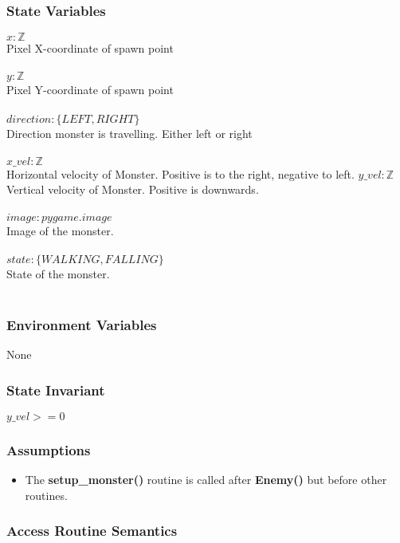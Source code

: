 \documentclass[12pt]{article}
\begin{document}
\subsubsection* {State Variables}

$x: \mathbb{Z}$\\
Pixel X-coordinate of spawn point\\\\
$y: \mathbb{Z}$\\
Pixel Y-coordinate of spawn point\\\\
$direction: \{LEFT,RIGHT\}$\\
Direction monster is travelling. Either left or right \\\\
$x\_vel: \mathbb{Z}$ \\
Horizontal velocity of Monster. Positive is to the right, negative to left.
$y\_vel: \mathbb{Z}$ \\
Vertical velocity of Monster. Positive is downwards.\\\\
$image: pygame.image$\\
Image of the monster.\\\\
$state: \{WALKING, FALLING\}$\\
State of the monster.\\\\


\subsubsection* {Environment Variables}
None
\subsubsection* {State Invariant}
$y\_vel >= 0$\\
\subsubsection* {Assumptions}
\begin{itemize}
\item The \textbf{setup\_monster()} routine is called after \textbf{Enemy()} but before other routines.
\end{itemize}

\subsubsection* {Access Routine Semantics}
\end{document}
